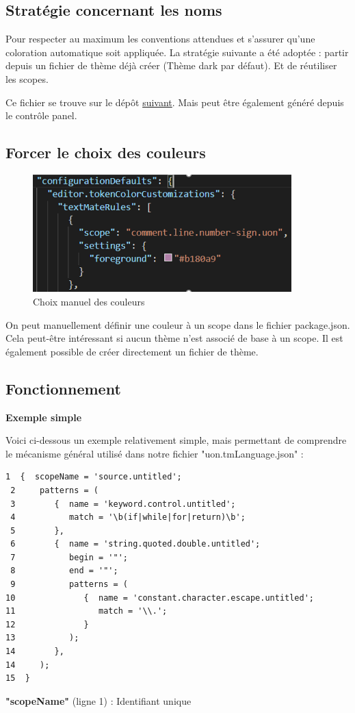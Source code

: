 \documentclass[
    iict, %
    il, %
]{heig-tb}
\begin{document}
\subsection{Stratégie concernant les noms}
Pour respecter au maximum les conventions attendues et s'assurer qu'une coloration automatique soit appliquée. La stratégie suivante a été adoptée : partir depuis un fichier de thème déjà créer (Thème dark par défaut). Et de réutiliser les scopes.

Ce fichier se trouve sur le dépôt \href{https://github.com/microsoft/vscode/blob/main/extensions/theme-defaults/themes/dark_vs.json}{suivant}.
Mais peut être également généré depuis le contrôle panel.

\subsection{Forcer le choix des couleurs}
\begin{figure}[!h]
    \begin{center}
        \includegraphics[width=10cm]{assets/figures/manual-settings-color.png}
    \end{center}
    \caption[Choix manuel des couleurs]{\label{manual-settings-color} Choix manuel des couleurs}
\end{figure}

On peut manuellement définir une couleur à un scope dans le fichier package.json.
Cela peut-être intéressant si aucun thème n'est associé de base à un scope.
Il est également possible de créer directement un fichier de thème.

\subsection{Fonctionnement}
\textbf{Exemple simple}

Voici ci-dessous un exemple relativement simple, mais permettant de comprendre le mécanisme général utilisé dans notre fichier "uon.tmLanguage.json" :
\begin{lstlisting}[frame=single, caption={Textmate grammar},label={Textmate grammar}]
 1  {  scopeName = 'source.untitled';
 2     patterns = (
 3        {  name = 'keyword.control.untitled';
 4           match = '\b(if|while|for|return)\b';
 5        },
 6        {  name = 'string.quoted.double.untitled';
 7           begin = '"';
 8           end = '"';
 9           patterns = (
10              {  name = 'constant.character.escape.untitled';
11                 match = '\\.';
12              }
13           );
14        },
14     );
15  }
\end{lstlisting}
\textbf{"scopeName"} (ligne 1) : Identifiant unique
\end{document}
